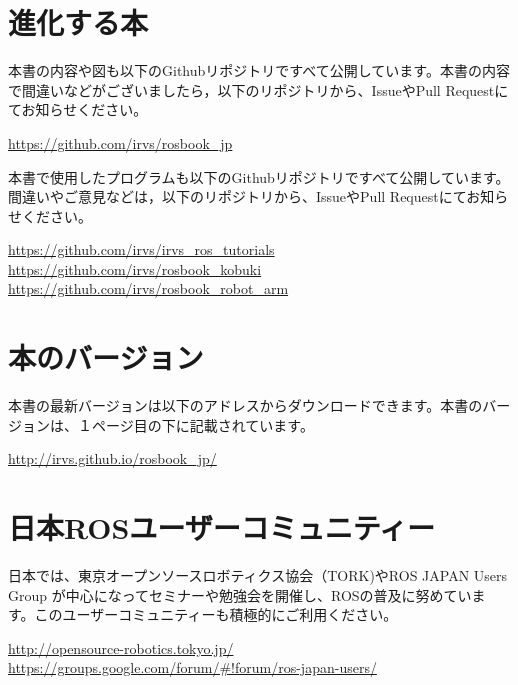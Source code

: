 \section*{進化する本}

本書の内容や図も以下のGithubリポジトリですべて公開しています。本書の内容で間違いなどがございましたら，以下のリポジトリから、IssueやPull Requestにてお知らせください。\\

\begin{textbox}
\url{https://github.com/irvs/rosbook\_jp}
\end{textbox}


\noindent 本書で使用したプログラムも以下のGithubリポジトリですべて公開しています。間違いやご意見などは，以下のリポジトリから、IssueやPull Requestにてお知らせください。\\

\begin{textbox}
\url{https://github.com/irvs/irvs\_ros\_tutorials}\\
\url{https://github.com/irvs/rosbook\_kobuki}\\
\url{https://github.com/irvs/rosbook\_robot\_arm}
\end{textbox}

\section*{本のバージョン}

本書の最新バージョンは以下のアドレスからダウンロードできます。本書のバージョンは、１ページ目の下に記載されています。\\

\begin{textbox}
\url{http://irvs.github.io/rosbook\_jp/}
\end{textbox}

\section*{日本ROSユーザーコミュニティー}

日本では、東京オープンソースロボティクス協会（TORK)やROS JAPAN Users Group が中心になってセミナーや勉強会を開催し、ROSの普及に努めています。このユーザーコミュニティーも積極的にご利用ください。\\

\begin{textbox}
 \url{http://opensource-robotics.tokyo.jp/}\\
\url{https://groups.google.com/forum/#!forum/ros-japan-users/}
\end{textbox}

